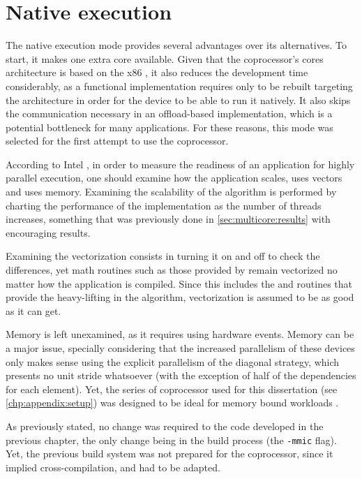 \documentclass[../thesis]{subfiles}
\begin{document}
	\section{Native execution}
	\label{sec:mic:native}

	The native execution mode provides several advantages over its alternatives. To start, it makes one extra core available. Given that the coprocessor's cores architecture is based on the x86 \isa, it also reduces the development time considerably, as a \cpu functional implementation requires only to be rebuilt targeting the \mic architecture in order for the device to be able to run it natively. It also skips the communication necessary in an offload-based implementation, which is a potential bottleneck for many applications. For these reasons, this mode was selected for the first attempt to use the \intel\xeonphi coprocessor.

	According to Intel \cite{Intel:MIC:Overview}, in order to measure the readiness of an application for highly parallel execution, one should examine how the application scales, uses vectors and uses memory. Examining the scalability of the algorithm is performed by charting the performance of the implementation as the number of threads increases, something that was previously done in \cref{sec:multicore:results} with encouraging results.

	Examining the vectorization consists in turning it on and off to check the differences, yet math routines such as those provided by \intel\mkl remain vectorized no matter how the application is compiled. Since this includes the \blas and \lapack routines that provide the heavy-lifting in the algorithm, vectorization is assumed to be as good as it can get.

	Memory is left unexamined, as it requires using hardware events. Memory can be a major issue, specially considering that the increased parallelism of these devices only makes sense using the explicit parallelism of the diagonal strategy, which presents no unit stride whatsoever (with the exception of half of the dependencies for each element). Yet, the series of \intel\xeonphi coprocessor used for this dissertation (see \cref{chp:appendix:setup}) was designed to be ideal for memory bound workloads \cite{Intel:MIC:Discovery}.

	As previously stated, no change was required to the code developed in the previous chapter, the only change being in the build process (the \texttt{-mmic} flag). Yet, the previous build system was not prepared for the \intel\xeonphi coprocessor, since it implied cross-compilation, and had to be adapted.

	
\end{document}
